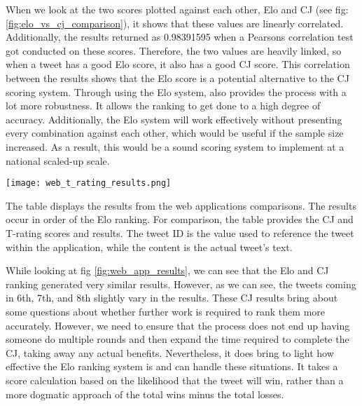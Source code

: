 	When we look at the two scores plotted against each other, Elo and CJ (see fig: \ref{fig:elo_vs_cj_comparison}), it shows that these values are linearly correlated. Additionally, the results returned as 0.98391595 when a Pearsons correlation test got conducted on these scores. Therefore, the two values are heavily linked, so when a tweet has a good Elo score, it also has a good CJ score. This correlation between the results shows that the Elo score is a potential alternative to the CJ scoring system. Through using the Elo system, also provides the process with a lot more robustness. It allows the ranking to get done to a high degree of accuracy. Additionally, the Elo system will work effectively without presenting every combination against each other, which would be useful if the sample size increased. As a result, this would be a sound scoring system to implement at a national scaled-up scale.


	\begin{table}[h]
		\centering
		\texttt{[image: web\_t\_rating\_results.png]}
		\caption{The table displays the results from the web applications comparisons. The results occur in order of the Elo ranking. For comparison, the table provides the CJ and T-rating scores and results. The tweet ID is the value used to reference the tweet within the application, while the content is the actual tweet's text.}
		\label{fig:web_app_results}
		
	\end{table}
	
	
	While looking at fig \ref{fig:web_app_results}, we can see that the Elo and CJ ranking generated very similar results. However, as we can see, the tweets coming in 6th, 7th, and 8th slightly vary in the results. These CJ results bring about some questions about whether further work is required to rank them more accurately. However, we need to ensure that the process does not end up having someone do multiple rounds and then expand the time required to complete the CJ, taking away any actual benefits. Nevertheless, it does bring to light how effective the Elo ranking system is and can handle these situations. It takes a score calculation based on the likelihood that the tweet will win, rather than a more dogmatic approach of the total wins minus the total losses.
	
